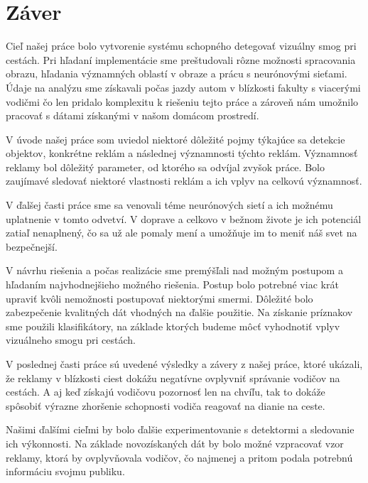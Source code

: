 \chapter*{Záver}\label{chap:conclusion}

Cieľ našej práce bolo vytvorenie systému schopného detegovať vizuálny smog pri cestách. Pri hľadaní implementácie sme preštudovali rôzne možnosti spracovania obrazu, hľadania významných oblastí v obraze a prácu s neurónovými sieťami. Údaje na analýzu sme získavali počas jazdy autom v blízkosti fakulty s viacerými vodičmi čo len pridalo komplexitu k riešeniu tejto práce a zároveň nám umožnilo pracovať s dátami získanými v našom domácom prostredí.

V úvode našej práce som uviedol niektoré dôležité pojmy týkajúce sa detekcie objektov, konkrétne reklám a následnej významnosti týchto reklám. Významnosť reklamy bol dôležitý parameter, od ktorého sa odvíjal zvyšok práce. Bolo zaujímavé sledovať niektoré vlastnosti reklám a ich vplyv na celkovú významnosť.

V ďalšej časti práce sme sa venovali téme neurónových sietí a ich možnému uplatnenie v tomto odvetví. V doprave a celkovo v bežnom živote je ich potenciál zatiaľ nenaplnený, čo sa už ale pomaly mení a umožňuje im to meniť náš svet na bezpečnejší.

V návrhu riešenia a počas realizácie sme premýšľali nad možným postupom a hľadaním najvhodnejšieho možného riešenia. Postup bolo potrebné viac krát upraviť kvôli nemožnosti postupovať niektorými smermi. Dôležité bolo zabezpečenie kvalitných dát vhodných na ďalšie použitie. Na získanie príznakov sme použili klasifikátory, na základe ktorých budeme môcť vyhodnotiť vplyv vizuálneho smogu pri cestách.

V poslednej časti práce sú uvedené výsledky a závery z našej práce, ktoré ukázali, že reklamy v blízkosti ciest dokážu negatívne ovplyvniť správanie vodičov na cestách. A aj keď získajú vodičovu pozornosť len na chvíľu, tak to dokáže spôsobiť výrazne zhoršenie schopnosti vodiča reagovať na dianie na ceste.

Našimi ďalšími cieľmi by bolo ďalšie experimentovanie s detektormi a sledovanie ich výkonnosti. Na základe novozískaných dát by bolo možné vzpracovať vzor reklamy, ktorá by ovplyvňovala vodičov, čo najmenej a pritom podala potrebnú informáciu svojmu publiku.




